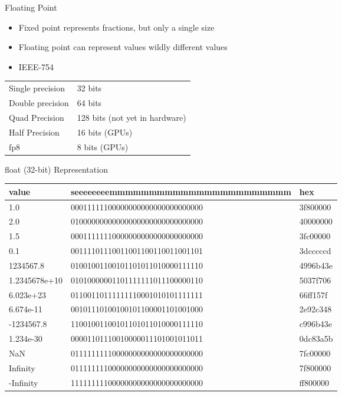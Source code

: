 \begin{withoutheadline}
\begin{frame}[fragile]{Floating Point}
\begin{itemize}
    \item Fixed point represents fractions, but only a single size
    \item Floating point can represent values wildly different values
    \item IEEE-754
\end{itemize}
\begin{tabular}{p{4cm}|p{5cm}} \toprule
Single precision & 32 bits \\
Double precision & 64 bits \\
Quad Precision   & 128 bits (not yet in hardware) \\
Half Precision   & 16 bits  (GPUs) \\
fp8              & 8 bits  (GPUs)  \\ \bottomrule
\end{tabular}
\end{frame}

\begin{frame}[fragile]{float (32-bit) Representation}
\setlength{\tabcolsep}{2pt}
\scriptsize
\ttfamily
\begin{tabular}{p{2cm}|p{10cm}|p{2cm}} \toprule
value         & seeeeeeeemmmmmmmmmmmmmmmmmmmmmmm &      hex \\ \midrule
1.0           & 00011111100000000000000000000000 & 3f800000 \\
2.0           & 01000000000000000000000000000000 & 40000000 \\
1.5           & 00011111110000000000000000000000 & 3fc00000 \\
0.1           & 00111101110011001100110011001101 & 3dcccccd \\
1234567.8     & 01001001100101101011010000111110 & 4996b43e \\
1.2345678e+10 & 01010000001101111111011100000110 & 5037f706 \\
6.023e+23     & 01100110111111110001010101111111 & 66ff157f \\
6.674e-11     & 00101110100100101100001101001000 & 2e92c348 \\
-1234567.8    & 11001001100101101011010000111110 & c996b43e \\
1.234e-30     & 00001101110010000011101001011011 & 0dc83a5b \\
NaN           & 01111111110000000000000000000000 & 7fc00000 \\
Infinity      & 01111111100000000000000000000000 & 7f800000 \\
-Infinity     & 11111111100000000000000000000000 & ff800000 \\ \bottomrule
\end{tabular}
\end{frame}


\end{withoutheadline}
